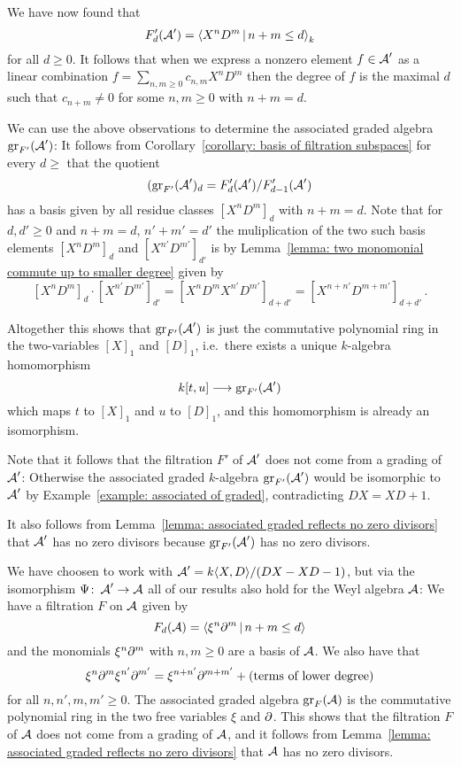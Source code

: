 \begin{fluff}
  We have now found that
  \[
      F'_d(\weyl')
    = \gen{
        X^n D^m
      \suchthat
        n + m \leq d
      }_k
  \]
  for all $d \geq 0$.
  It follows that when we express a nonzero element $f \in \operatorname{\mathcal{A}}'$ as a linear combination $f = \sum_{n, m \geq 0} c_{n,m} X^n D^m$ then the degree of $f$ is the maximal $d$ such that $c_{n+m} \neq 0$ for some $n, m \geq 0$ with $n+m = d$.
  
  We can use the above observations to determine the associated graded algebra $\operatorname{gr}_{F'}(\operatorname{\mathcal{A}}')$:
  It follows from Corollary~\ref{corollary: basis of filtration subspaces} for every $d \geq $ that the quotient
  \[
      (\operatorname{gr}_{F'}(\operatorname{\mathcal{A}}')_d
    = F'_d(\operatorname{\mathcal{A}}') / F'_{d-1}(\operatorname{\mathcal{A}}')
  \]
  has a basis given by all residue classes $[X^n D^m]_d$ with $n + m = d$.
  Note that for $d, d' \geq 0$ and $n + m = d$, $n' + m' = d'$ the muliplication of the two such basis elements $[X^n D^m]_d$ and $[X^{n'} D^{m'}]_{d'}$ is by Lemma~\ref{lemma: two monomonial commute up to smaller degree} given by
  \[
      [X^n D^m]_d \cdot [X^{n'} D^{m'}]_{d'}
    = [X^n D^m X^{n'} D^{m'}]_{d + d'}
    = [X^{n + n'} D^{m + m'}]_{d + d'} \,.
  \]
  
  Altogether this shows that $\operatorname{gr}_{F'}(\operatorname{\mathcal{A}}')$ is just the commutative polynomial ring in the two-variables $[X]_1$ and $[D]_1$, i.e.\ there exists a unique $k$-algebra homomorphism
  \[
            k[t,u]
    \longrightarrow \operatorname{gr}_{F'}(\operatorname{\mathcal{A}}')
  \]
  which maps $t$ to $[X]_1$ and $u$ to $[D]_1$, and this homomorphism is already an isomorphism.
  
  Note that it follows that the filtration $F'$ of $\operatorname{\mathcal{A}}'$ does not come from a grading of $\operatorname{\mathcal{A}}'$:
  Otherwise the associated graded $k$-algebra $\operatorname{gr}_{F'}(\operatorname{\mathcal{A}}')$ would be isomorphic to $\operatorname{\mathcal{A}}'$ by Example~\ref{example: associated of graded}, contradicting $DX = XD + 1$.
  
  It also follows from Lemma~\ref{lemma: associated graded reflects no zero divisors} that $\operatorname{\mathcal{A}}'$ has no zero divisors because $\operatorname{gr}_{F'}(\operatorname{\mathcal{A}}')$ has no zero divisors.
\end{fluff}


\begin{fluff}
  We have choosen to work with $\operatorname{\mathcal{A}}' = k\!\left\langle X,D \right\rangle\!/(DX-XD-1)$, but via the isomorphism $\Psi \colon \operatorname{\mathcal{A}}' \to \operatorname{\mathcal{A}}$ all of our results also hold for the Weyl algebra $\operatorname{\mathcal{A}}$:
  We have a filtration $F$ on $\operatorname{\mathcal{A}}$ given by
  \[
      F_d(\weyl)
    = \gen{ \xi^n \del^m \suchthat n + m \leq d }
  \]
  and the monomials $\xi^n \partial^m$ with $n, m \geq 0$ are a basis of $\operatorname{\mathcal{A}}$.
  We also have that
  \[
      \xi^n \partial^m \xi^{n'} \partial^{m'}
    =   \xi^{n + n'} \partial^{m + m'}
      + (\text{terms of lower degree})
  \]
  for all $n, n', m, m' \geq 0$.
  The associated graded algebra $\operatorname{gr}_F(\operatorname{\mathcal{A}})$ is the commutative polynomial ring in the two free variables $\xi$ and $\partial$.
  This shows that the filtration $F$ of $\operatorname{\mathcal{A}}$ does not come from a grading of $\operatorname{\mathcal{A}}$, and it follows from Lemma~\ref{lemma: associated graded reflects no zero divisors} that $\operatorname{\mathcal{A}}$ has no zero divisors.
\end{fluff}


